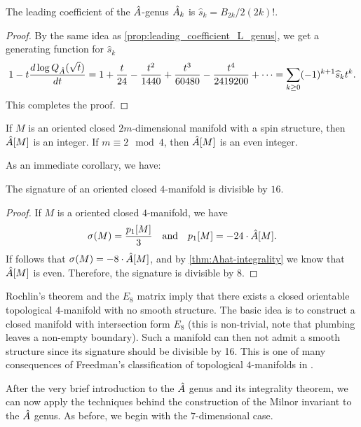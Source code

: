 \begin{proposition}\label{prop:leading_coefficient_Ahat_genus}
	The leading coefficient of the $\hat{A}$-genus $\hat{A}_k$ is $\widehat{s}_k=B_{2k}/2(2k)!$.
\end{proposition}
\begin{proof}
	By the same idea as \cref{prop:leading_coefficient_L_genus}, we get a generating function for $\widehat{s}_k$
	\[
		1-t\frac{d\log Q_{\hat{A}}(\sqrt{t})}{dt} = 1+\frac{t}{24}-\frac{t^2}{1440}+\frac{t^3}{60480} - \frac{t^4}{2419200}+\cdots = \sum_{k\geq 0} (-1)^{k+1}\widehat{s}_k t^k.
	\]
	This completes the proof.
\end{proof}

\begin{theorem}\label{thm:Ahat-integrality}
	If $M$ is an oriented closed $2m$-dimensional manifold with a spin structure, then $\hat{A}[M]$ is an integer. If $m\equiv 2\mod 4$, then $\hat{A}[M]$ is an even integer.
\end{theorem}

As an immediate corollary, we have:

\begin{theorem}[Rochlin]\label{thm:rochlin}
	The signature of an oriented closed $4$-manifold is divisible by $16$.
\end{theorem}
\begin{proof}
	If $M$ is a oriented closed $4$-manifold, we have
	\[
		\sigma(M) = \frac{p_1[M]}{3}\quad\textrm{and}\quad p_1[M] = -24\cdot\hat{A}[M].
	\]
	If follows that $\sigma(M)=-8\cdot\hat{A}[M]$, and by \cref{thm:Ahat-integrality} we know that $\hat{A}[M]$ is even. Therefore, the signature is divisible by $8$.
\end{proof}

\begin{remark}\label{rmk:E8-manifold}
	Rochlin's theorem and the $E_8$ matrix imply that there exists a closed orientable topological $4$-manifold with no smooth structure. The basic idea is to construct a closed manifold with intersection form $E_8$ (this is non-trivial, note that plumbing leaves a non-empty boundary). 
	Such a manifold can then not admit a smooth structure since its signature should be divisible by 16. This is one of many consequences of Freedman's classification of topological $4$-manifolds in \cite{freedman1982manifold}.
\end{remark}

After the very brief introduction to the $\hat{A}$ genus and its integrality theorem, we can now apply the techniques behind the construction of the Milnor invariant to the $\hat{A}$ genus. As before, we begin with the $7$-dimensional case. 

